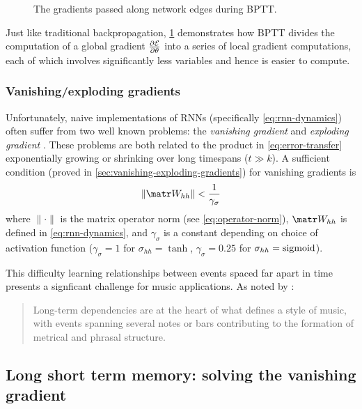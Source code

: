 \begin{figure}[tb]
    \centering
    
    \caption{The gradients passed along network edges during BPTT.}
    \label{fig:rnn-bptt}
\end{figure}

Just like traditional backpropagation, \cref{fig:rnn-bptt} demonstrates how
BPTT divides the computation of a global gradient $\frac{\partial \mathcal{E}}{\partial
\theta}$ into a series of local gradient computations, each of which involves
significantly less variables and hence is easier to compute.

\subsubsection{Vanishing/exploding gradients}

Unfortunately, naive implementations of RNNs (specifically
\cref{eq:rnn-dynamics}) often suffer from two well known problems: the
\emph{vanishing gradient} and \emph{exploding gradient} \citep{Bengio1994}.
These problems are both related to the product in \cref{eq:error-transfer}
exponentially growing or shrinking over long timespans (\ie $t \gg k$). A
sufficient condition (proved in \vref{sec:vanishing-exploding-gradients}) for
vanishing gradients is
\begin{equation}\label{eq:vanishing-gradients-suff}
  \left\| \W_{hh} \right\| < \frac{1}{\gamma_\sigma}
\end{equation}
where $\| \cdot \|$ is the matrix operator norm (see \vref{eq:operator-norm}),
$\W_{hh}$ is defined in \vref{eq:rnn-dynamics},
and $\gamma_\sigma$ is a constant depending on choice of activation function
(\eg $\gamma_\sigma = 1$ for $\sigma_{hh} = \tanh$, $\gamma_\sigma = 0.25$ for
$\sigma_{hh} = \operatorname*{sigmoid}$).

This difficulty learning relationships between events spaced far apart in time
presents a signficant challenge for music applications. As noted by
\citet{cooper1963rhythmic}:
\begin{quote}
  Long-term dependencies are at the heart of what defines a style of music, with
  events spanning several notes or bars contributing to the formation of metrical and phrasal
  structure.
\end{quote}

\subsection{Long short term memory: solving the vanishing gradient}\label{sec:LSTM}

